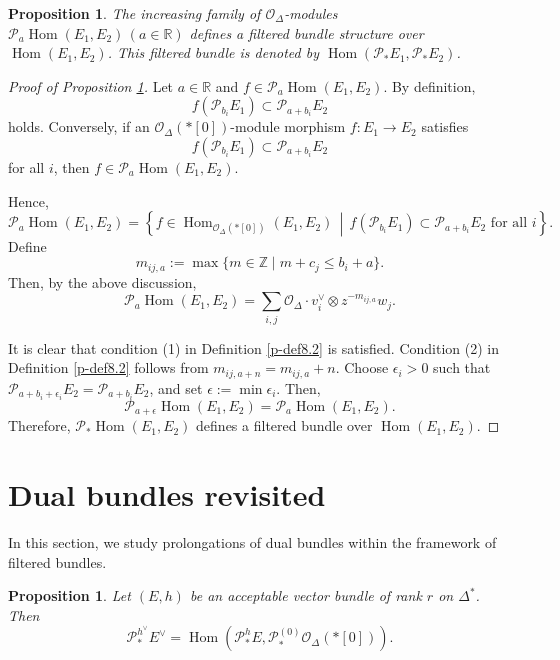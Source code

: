 \documentclass[12pt,twoside]{amsart}
\DeclareMathOperator{\Hom}{Hom}
\newtheorem{prop}[thm]{Proposition}
\theoremstyle{definition}
\begin{document}
\begin{prop}\label{p-prop14.4}
The increasing family of $\mathcal{O}_\Delta$-modules $\mathcal{P}_a 
\Hom(E_1, E_2)\,(a \in \mathbb{R})$ defines a filtered bundle structure over 
$\Hom(E_1, E_2)$. This filtered bundle is denoted by 
$\Hom(\mathcal{P}_\ast E_1, \mathcal{P}_\ast E_2)$.
\end{prop}

\begin{proof}[Proof of Proposition \ref{p-prop14.4}]
Let $a \in \mathbb{R}$ and 
$f \in \mathcal{P}_a \Hom(E_1, E_2)$. 
By definition, 
\[f(\mathcal{P}_{b_i} E_1) 
\subset \mathcal{P}_{a + b_i} E_2
\] 
holds. 
Conversely, if an $\mathcal{O}_\Delta(*[0])$-module 
morphism $f \colon E_1 \to E_2$ satisfies 
\[
f(\mathcal{P}_{b_i} E_1) 
\subset \mathcal{P}_{a + b_i} E_2
\] 
for all $i$, 
then $f \in \mathcal{P}_a \Hom(E_1, E_2)$. 

Hence,
\[
\mathcal{P}_a \Hom(E_1, E_2) = 
\left\{ f \in \Hom_{\mathcal{O}_\Delta(*[0])}(E_1, E_2) \,\middle|\, 
f(\mathcal{P}_{b_i} E_1) \subset \mathcal{P}_{a + b_i} E_2 \text{ for all } i\right\}.
\]
Define 
\[
m_{ij,a} := \max\{ m \in \mathbb{Z} \mid m + c_j \leq b_i + a \}.
\]
Then, by the above discussion,
\[
\mathcal{P}_a \Hom(E_1, E_2) = 
\sum_{i,j} \mathcal{O}_\Delta \cdot v_i^\vee \otimes z^{-m_{ij,a}} w_j.
\]

It is clear that condition (1) in Definition \ref{p-def8.2} 
is satisfied. 
Condition (2) in Definition \ref{p-def8.2} follows from $m_{ij,a+n} = 
m_{ij,a} + n$. Choose $\epsilon_i > 0$ such that 
$\mathcal{P}_{a + b_i + \epsilon_i} E_2 = \mathcal{P}_{a + b_i} E_2$, 
and set $\epsilon := \min \epsilon_i$. Then,
\[
\mathcal{P}_{a+\epsilon} \Hom(E_1, E_2) = \mathcal{P}_a \Hom(E_1, E_2).
\]
Therefore, $\mathcal{P}_\ast \Hom(E_1, E_2)$ 
defines a filtered bundle over $\Hom(E_1, E_2)$.
\end{proof}

\section{Dual bundles revisited}\label{p-sec15}

In this section, we study prolongations of dual bundles 
within the framework of filtered bundles.

\begin{prop}\label{p-prop15.1}
Let \( (E, h) \) be an acceptable 
vector bundle of rank \( r \) on \( \Delta^* \). Then
\[
\mathcal{P}^{h^\vee}_\ast E^\vee = 
\Hom(\mathcal{P}^h_\ast E, \mathcal{P}^{(0)}_{\ast} \mathcal{O}_\Delta(*[0])).
\]
\end{prop}
\end{document}
